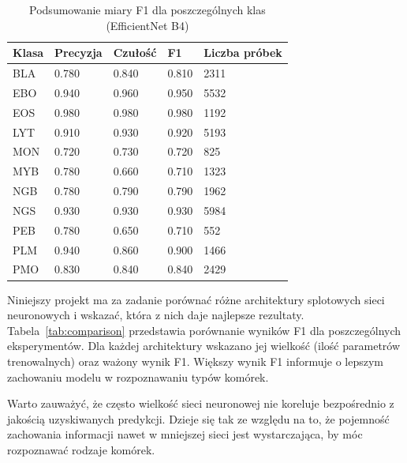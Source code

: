 \begin{table}
    \begin{center}
        \begin{tabular}{|l|l|l|l|l|}
            \hline
            Klasa & Precyzja & Czułość & F1    & Liczba próbek \\
            \hline
            BLA   & 0.780    & 0.840   & 0.810 & 2311          \\
            \hline
            EBO   & 0.940    & 0.960   & 0.950 & 5532          \\
            \hline
            EOS   & 0.980    & 0.980   & 0.980 & 1192          \\
            \hline
            LYT   & 0.910    & 0.930   & 0.920 & 5193          \\
            \hline
            MON   & 0.720    & 0.730   & 0.720 & 825           \\
            \hline
            MYB   & 0.780    & 0.660   & 0.710 & 1323          \\
            \hline
            NGB   & 0.780    & 0.790   & 0.790 & 1962          \\
            \hline
            NGS   & 0.930    & 0.930   & 0.930 & 5984          \\
            \hline
            PEB   & 0.780    & 0.650   & 0.710 & 552           \\
            \hline
            PLM   & 0.940    & 0.860   & 0.900 & 1466          \\
            \hline
            PMO   & 0.830    & 0.840   & 0.840 & 2429          \\
            \hline
        \end{tabular}
    \end{center}
    \caption{Podsumowanie miary F1 dla poszczególnych klas (EfficientNet B4)}
    \label{tab:f1_summary}
\end{table}

Niniejszy projekt ma za zadanie porównać różne architektury splotowych sieci neuronowych i wskazać, która z nich daje najlepsze rezultaty.
Tabela~\ref{tab:comparison} przedstawia porównanie wyników F1 dla poszczególnych eksperymentów.
Dla każdej architektury wskazano jej wielkość (ilość parametrów trenowalnych) oraz ważony wynik F1.
Większy wynik F1 informuje o lepszym zachowaniu modelu w rozpoznawaniu typów komórek.

Warto zauważyć, że często wielkość sieci neuronowej nie koreluje bezpośrednio z jakością uzyskiwanych predykcji.
Dzieje się tak ze względu na to, że pojemność zachowania informacji nawet w mniejszej sieci jest wystarczająca, by móc rozpoznawać rodzaje komórek.

